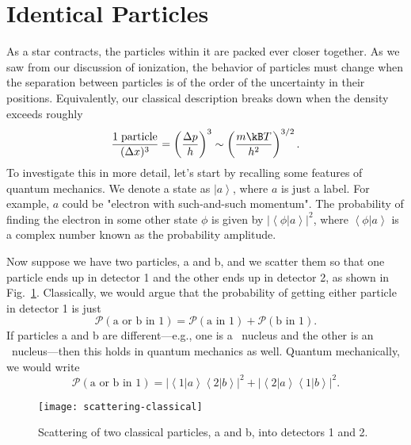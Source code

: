 
\newcommand*{\bra}[1]{\ensuremath{\left\langle#1\right|}}
\newcommand*{\ket}[1]{\ensuremath{\left|#1\right\rangle}}
\newcommand*{\braket}[2]{\ensuremath{\left\langle#1\right|\left.#2\right\rangle}}

\section{Identical Particles}
\label{s.identical-particles}

As a star contracts, the particles within it are packed ever closer together.  As we saw from our discussion of ionization, the behavior of particles must change when the separation between particles is of the order of the uncertainty in their positions.  Equivalently, our classical description breaks down when the density exceeds roughly
\begin{equation}
    \frac{1\;\textrm{particle}}{(\Delta x)^3} 
    = \left(\frac{\Delta p}{h}\right)^3 
    \sim \left(\frac{m\kB T}{h^2}\right)^{3/2}.
\end{equation}
To investigate this in more detail, let's start by recalling some features of quantum mechanics. We denote a state as $\ket{a}$, where $a$ is just a label.  For example, $a$ could be "electron with such-and-such momentum".  The probability of finding the electron in some other state $\phi$ is given by $|\braket{\phi}{a}|^2$, where $\braket{\phi}{a}$ is a complex number known as the probability amplitude.

Now suppose we have two particles, a and b, and we scatter them so that one particle ends up in detector 1 and the other ends up in detector 2, as shown in Fig.~\ref{f.scattering-classical}. Classically, we would argue that the probability of getting either particle in detector 1 is just
\begin{equation}
    \mathcal{P}(\textrm{a or b in 1}) = \mathcal{P}(\textrm{a in 1}) + \mathcal{P}(\textrm{b in 1}).
\end{equation}
If particles a and b are different---e.g., one is a \carbon\ nucleus and the other is an \oxygen\ nucleus---then this holds in quantum mechanics as well. Quantum mechanically, we would write
\begin{equation}
    \mathcal{P}(\textrm{a or b in 1}) = |\braket{1}{a}\braket{2}{b}|^2 + |\braket{2}{a}\braket{1}{b}|^2.
\end{equation}

\begin{figure}
    \texttt{[image: scattering-classical]}
    \caption[Scattering of two identical classical particles]{\label{f.scattering-classical} Scattering of two classical particles, a and b, into detectors 1 and 2.}
\end{figure}

